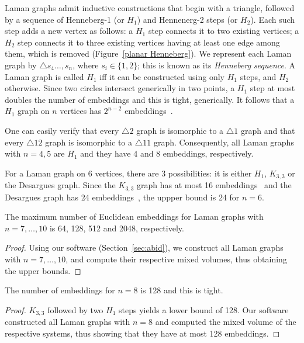 \documentclass[envcountsame]{llncs}
\begin{document}
 Laman graphs admit inductive constructions  that begin with  a triangle, followed by a sequence of Henneberg-1 (or $H_1$) and Hennenerg-2 steps (or $H_2$).  Each such step adds a new  vertex as follows:
a $H_1$ step  connects it to two existing vertices;
a $H_2$ step  connects it to three existing vertices having
at least one edge among them, which is removed (Figure~\ref{planar Henneberg}).
We represent each Laman graph by $\bigtriangleup s_4 \ldots,s_n$, where $s_i \in\{1,2\}$; this is known as
 its {\em Henneberg sequence}.
A Laman graph  is called  $H_1$ iff it can be constructed using only $H_1$ steps, and
 $H_2$ otherwise.
Since two circles intersect generically in two points, a $H_1$ step  at most doubles
the number of embeddings and this is tight, generically. It follows that a $H_1$  graph on $n$ vertices has  $2^{n-2}$ embeddings~\cite{BS04}.


One can easily verify that every $\bigtriangleup 2$ graph is isomorphic to a $\bigtriangleup 1$ graph and that 
every $\bigtriangleup 12 $ graph is isomorphic to a $\bigtriangleup 11$ graph. Consequently, all Laman graphs with  $n=4,5$ are $H_1$ and they have 4 and 8 embeddings, respectively.   

For a Laman graph on 6 vertices, there are 3 possibilities: it is either $H_1$,   $K_{3,3}$ or the Desargues graph. Since the $K_{3,3}$ graph  has at most 16 embeddings~\cite{W77,WH07} and  the Desargues graph has 24 embeddings~\cite{BS04}, the uppper bound is 24  for $n=6$.



\begin{lemma}\label{laman64}
The maximum number of Euclidean embeddings for Laman graphs with $n= 7,\dots,10$ 
is 64, 128, 512 and 2048, respectively.
\end{lemma}

\begin{proof}
Using our software (Section~\ref{sec:abid}), we construct all Laman graphs with $n=7,\dots,10$,
and compute their  respective mixed volumes, thus obtaining the upper bounds.
\end{proof}

\begin{lemma}
The number of embeddings for $n=8$ is 128 and this is tight.\end{lemma}
\begin{proof}
  $K_{3,3}$ followed by two $H_1$ steps yields a lower bound of 128.
  Our software constructed all Laman graphs with $n= 8$
  and computed the mixed volume of the respective systems, thus showing that they
have at most 128 embeddings.\end{proof}
\fi
\end{document}
